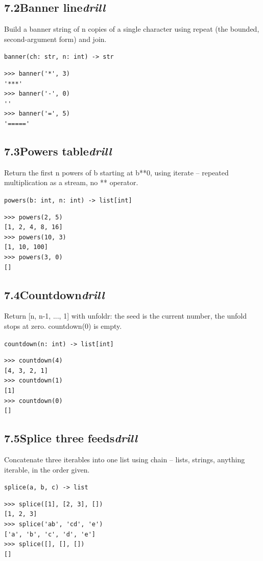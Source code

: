 \documentclass[10pt,letterpaper]{book}
\begin{document}
\subsection*{7.2\quad Banner line\hfill\textnormal{\textit{drill}}}
Build a banner string of n copies of a single character using repeat (the bounded, second-argument form) and join.

\noindent\texttt{banner(ch: str, n: int) -> str}
\begin{lstlisting}[style=ex]
>>> banner('*', 3)
'***'
>>> banner('-', 0)
''
>>> banner('=', 5)
'====='
\end{lstlisting}
\subsection*{7.3\quad Powers table\hfill\textnormal{\textit{drill}}}
Return the first n powers of b starting at b**0, using iterate -- repeated multiplication as a stream, no ** operator.

\noindent\texttt{powers(b: int, n: int) -> list[int]}
\begin{lstlisting}[style=ex]
>>> powers(2, 5)
[1, 2, 4, 8, 16]
>>> powers(10, 3)
[1, 10, 100]
>>> powers(3, 0)
[]
\end{lstlisting}

\subsection*{7.4\quad Countdown\hfill\textnormal{\textit{drill}}}
Return [n, n-1, ..., 1] with unfoldr: the seed is the current number, the unfold stops at zero. countdown(0) is empty.

\noindent\texttt{countdown(n: int) -> list[int]}
\begin{lstlisting}[style=ex]
>>> countdown(4)
[4, 3, 2, 1]
>>> countdown(1)
[1]
>>> countdown(0)
[]
\end{lstlisting}
\subsection*{7.5\quad Splice three feeds\hfill\textnormal{\textit{drill}}}
Concatenate three iterables into one list using chain -- lists, strings, anything iterable, in the order given.

\noindent\texttt{splice(a, b, c) -> list}
\begin{lstlisting}[style=ex]
>>> splice([1], [2, 3], [])
[1, 2, 3]
>>> splice('ab', 'cd', 'e')
['a', 'b', 'c', 'd', 'e']
>>> splice([], [], [])
[]
\end{lstlisting}
\end{document}
